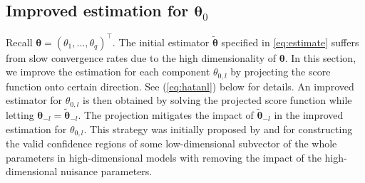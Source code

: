 \documentclass[12pt]{article}
\newcommand{\btheta}{\boldsymbol \theta}
\def\T{{\scriptscriptstyle \top} }
\newcommand{\0}{{\bf 0}}
\begin{document}
\subsection{Improved estimation for $\btheta_0$} \label{sec:improvedEstimation}

Recall $\btheta=(\theta_1,\ldots,\theta_q)^{\T}$. The initial estimator $\tilde{\btheta}$ specified in \eqref{eq:estimate} suffers from slow convergence rates due to the high dimensionality of $\btheta$.
In this section, we improve the estimation for each component $\theta_{0,l}$ by projecting the score function onto certain direction. See (\ref{eq:hatanl}) below for details. An improved estimator for $\theta_{0,l}$ is then obtained by solving the projected score function while  letting $\btheta_{-l} =
\tilde{\btheta}_{-l}$. The projection mitigates the impact 
of $\tilde{\btheta}_{-l}$ in the improved estimation for $\theta_{0,l}$. This strategy was initially proposed by \cite{ChangChenTangWu2021} and \cite{ChangShiZhang2023} for constructing the valid confidence regions of some low-dimensional subvector of the whole parameters in high-dimensional models with removing the impact of the high-dimensional nuisance parameters.
\end{document}
